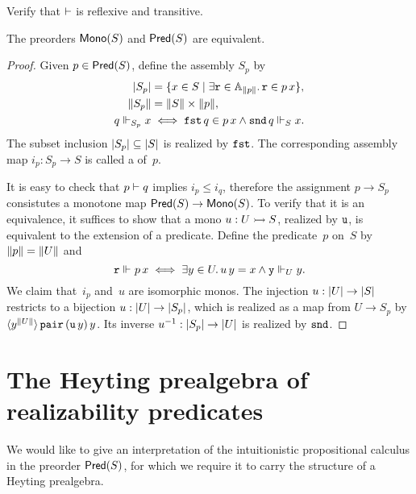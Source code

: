 \begin{exercise}
  Verify that $\entails$ is reflexive and transitive.
\end{exercise}

\begin{theorem}
  The preorders $\Mono{S}$ and $\Pred{S}$ are equivalent.
\end{theorem}

\begin{proof}
  Given $p \in \Pred{S}$, define the assembly $S_p$ by
  \begin{align*}
    \S{S_p} &= \set{x \in S \such \some{\R{r} \in \Atyp{\T{p}}}{\R{r} \in p\,x}}, \\
    \T{S_p} &= \T{S} \times \T{p}, \\
    q \rz[S_p] x &\iff
                   \combFst\,q \in p \, x \land \combSnd \, q \rz[S] x.
  \end{align*}
  The subset inclusion $\S{S_p} \subseteq \S{S}$ is realized by $\combFst$.
  The corresponding assembly map $i_p : S_p \to S$ is called a  of~$p$.

  It is easy to check that $p \entails q$ implies $i_p \leq i_q$, therefore the assignment $p \to S_p$ consistutes a monotone map $\Pred{S} \to \Mono{S}$.
  To verify that it is an equivalence, it suffices to show that a mono
  $u : U \monoto S$, realized by $\R{u}$, is equivalent to the extension of a predicate.
  Define the predicate~$p$ on~$S$ by $\T{p} = \T{U}$ and
  \begin{equation*}
    \R{r} \rz p \, x 
    \iff
    \some{y \in U} u\,y = x \land \R{y} \rz[U] y.
  \end{equation*}
  We claim that~$i_p$ and~$u$ are isomorphic monos.
  The injection $u : \S{U} \to \S{S}$ restricts to a
  bijection $u : \S{U} \to \S{S_p}$, which is realized as a map from $U \to
  S_p$ by
  $\tpcalam{y}{\T{U}} \combPair\,(\R{u}\,y)\,y$. Its inverse
  $\inv{u} : \S{S_p} \to \S{U}$ is realized by $\combSnd$.
\end{proof}


\section{The Heyting prealgebra of realizability predicates}
\label{sec:heyting-prealgebra}

We would like to give an interpretation of the intuitionistic propositional calculus in
the preorder $\Pred{S}$, for which we require it to carry the structure of a Heyting
prealgebra.

